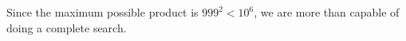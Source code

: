 Since the maximum possible product is $999^2<10^6$, we are more than capable of doing a complete search.
